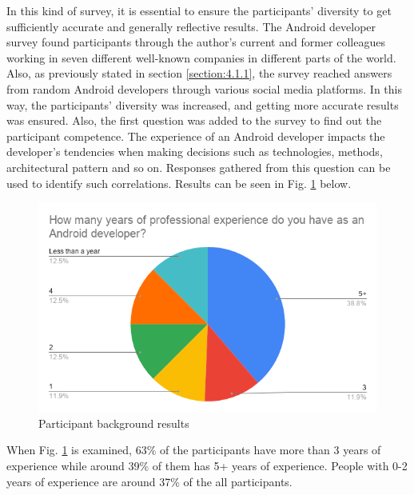 In this kind of survey, it is essential to ensure the participants’ diversity to get sufficiently accurate and generally reflective results. The Android developer survey found participants through the author's current and former colleagues working in seven different well-known companies in different parts of the world. Also, as previously stated in section \ref{section:4.1.1}, the survey reached answers from random Android developers through various social media platforms. In this way, the participants’ diversity was increased, and getting more accurate results was ensured. Also, the first question was added to the survey to find out the participant competence. The experience of an Android developer impacts the developer's tendencies when making decisions such as technologies, methods, architectural pattern and so on. Responses gathered from this question can be used to identify such correlations. Results can be seen in Fig. \ref{fig:dev_experience} below.
\begin{figure}[ht!]
    \centering
    \includegraphics[scale=0.6]{figures/survey_q1_dev_experience.png}
    \caption{Participant background results}
    \label{fig:dev_experience}
\end{figure}
\FloatBarrier
When Fig. \ref{fig:dev_experience} is examined, 63\% of the participants have more than 3 years of experience while around 39\% of them has 5+ years of experience. People with 0-2 years of experience are around 37\% of the all participants.